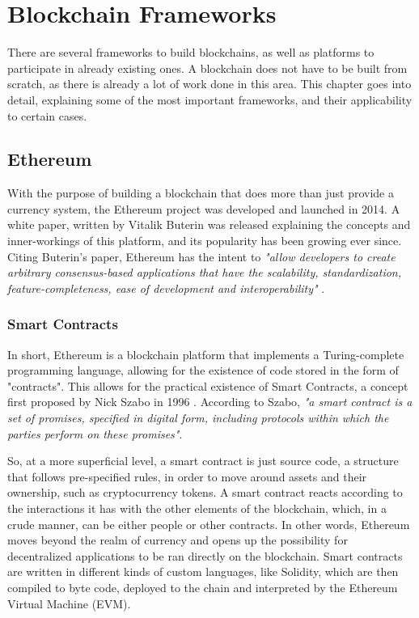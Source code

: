 \chapter{Blockchain Frameworks}
\label{chap:blockchain-frameworks}

\minitoc \mtcskip \noindent

There are several frameworks to build blockchains, as well as platforms to participate in already existing ones. A blockchain does not have to be built from scratch, as there is already a lot of work done in this area. This chapter goes into detail, explaining some of the most important frameworks, and their applicability to certain cases.

\section{Ethereum}

With the purpose of building a blockchain that does more than just provide a currency system, the Ethereum project was developed and launched in 2014. A white paper, written by Vitalik Buterin was released explaining the concepts and inner-workings of this platform, and its popularity has been growing ever since. Citing Buterin's paper, Ethereum has the intent to \textit{"allow developers to create arbitrary consensus-based applications that have the
scalability, standardization, feature-completeness, ease of development and interoperability" } \cite{Buterin2014}.

\subsection{Smart Contracts}
In short, Ethereum is a blockchain platform that implements a Turing-complete programming language, allowing for the existence of code stored in the form of "contracts". This allows for the practical existence of Smart Contracts, a concept first proposed by Nick Szabo in 1996 \cite{szabo1996smart}. According to Szabo, \textit{"a smart contract is a set of promises, specified in digital form, including protocols within which the parties perform on these promises"}. 


So, at a more superficial level, a smart contract is just source code, a structure that follows pre-specified rules, in order to move around assets and their ownership, such as cryptocurrency tokens. A smart contract reacts according to the interactions it has with the other elements of the blockchain, which, in a crude manner, can be either people or other contracts. In other words, Ethereum moves beyond the realm of currency and opens up the possibility for decentralized applications to be ran directly on the blockchain. Smart contracts are written in different kinds of custom languages, like Solidity, which are then compiled to byte code, deployed to the chain and interpreted by the Ethereum Virtual Machine (EVM).

